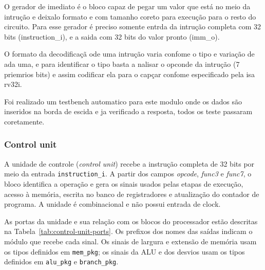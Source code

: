 O gerador de imediato é o bloco capaz de pegar um valor que está no meio da intrução e deixalo formato e com tamanho coreto para execução para o resto do circuito. Para esse gerador é preciso somente entrda da intrução completa com 32 bits (instruction_i), e a saida com 32 bits do valor pronto (imm_o).

O formato da decodificaçã ode uma intrução varia confome o tipo e variação de ada uma, e para identificar o tipo basta a nalisar o opconde da intrução (7 priemrios bits) e assim codificar ela para o capçar confome especificado pela isa rv32i.

Foi realizado um testbench automatico para este modulo onde os dados são inseridos na borda de escida e ja verificado a resposta, todos os teste passaram coretamente.

\subsubsection{Control unit}
\label{subsub:control_unit}

A unidade de controle (\textit{control unit}) recebe a instrução completa de 32 bits por meio da entrada \texttt{instruction\_i}. A partir dos campos \textit{opcode}, \textit{func3} e \textit{func7}, o bloco identifica a operação e gera os sinais usados pelas etapas de execução, acesso à memória, escrita no banco de registradores e atualização do contador de programa. A unidade é combinacional e não possui entrada de clock.


As portas da unidade e sua relação com os blocos do processador estão descritas na Tabela~\ref{tab:control-unit-ports}. Os prefixos dos nomes das saídas indicam o módulo que recebe cada sinal. Os sinais de largura e extensão de memória usam os tipos definidos em \texttt{mem\_pkg}; os sinais da ALU e dos desvios usam os tipos definidos em \texttt{alu\_pkg} e \texttt{branch\_pkg}.

